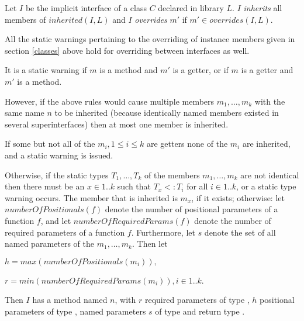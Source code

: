 \documentclass{article}
\begin{document}
\LMHash{}
Let $I$ be the implicit interface of a class $C$ declared in library $L$.
$I$ {\em inherits} all members of $inherited(I, L)$ and $I$ {\em overrides} $m'$ if $m' \in overrides(I, L)$.

\LMHash{}
All the static warnings pertaining to the overriding of instance members given in section \ref{classes} above hold for overriding between interfaces as well.

\LMHash{}
It is a static warning if $m$ is a method and $m'$ is a getter, or if $m$ is a getter and $m'$ is a method.




\LMHash{}
However, if the above rules would cause multiple members $m_1, \ldots, m_k$ with the same name $n$ to be inherited (because identically named members existed in several superinterfaces) then at most one member is inherited.

\LMHash{}
If some but not all of the $m_i, 1 \le i \le k$ are getters none of the $m_i$ are inherited, and a static warning is issued.

\LMHash{}
Otherwise, if the static types $T_1, \ldots, T_k$ of the members $m_1, \ldots, m_k$ are not identical then there must be an $x \in 1 .. k$ such that $T_x <: T_i$ for all $i \in 1 .. k$,
or a static type warning occurs.
The member that is inherited  is $m_x$, if it exists; otherwise:
let $numberOfPositionals(f)$ denote the number of positional parameters of a function $f$,
and let $numberOfRequiredParams(f)$ denote the number of required parameters of a function $f$.
Furthermore, let $s$ denote the set of all named parameters of the $m_1, \ldots, m_k$.
Then let

$h = max(numberOfPositionals(m_i)), $

$r = min(numberOfRequiredParams(m_i)), i \in 1 .. k$.

\LMHash{}
Then $I$ has a method named $n$, with $r$ required parameters of type \DYNAMIC{}, $h$ positional parameters of type \DYNAMIC{}, named parameters $s$ of type \DYNAMIC{} and return type \DYNAMIC{}.
\end{document}
